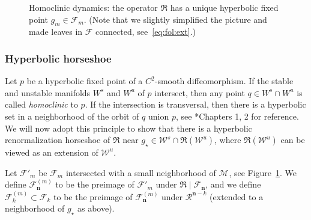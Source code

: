 \documentclass{amsart}
\newcommand{\1}{{\mathbb 1 }}
\newcommand\MM{\mathscr{M}}
\newcommand\RRR{{\mathfrak R}}
\newcommand\RR{\mathcal{R}}
\newcommand{\bbn}{{\mathbf n}}
\newcommand{\str}{{\star}}
\newcommand\WW{\mathcal{W}}
\newcommand\cp{{}}%
\newcommand{\bFol}{{\boldsymbol{ \mathcal F}}}
\theoremstyle{remark}
\numberwithin{equation}{section}
\theoremstyle{definition}
\theoremstyle{nonumberbreak}
\begin{document}
\begin{figure}[tp!]
\caption{Homoclinic dynamics: the operator $\RRR$ has a unique hyperbolic fixed point $g_m\in \bFol_m$. (Note that we slightly simplified the picture and made leaves in $\bFol$ connected, see~\eqref{eq:fol:ext}.)}
\label{fig:HomDyn}
\end{figure}


\subsubsection{Hyperbolic horseshoe} 
Let $p$ be a hyperbolic fixed point of a $C^2$-smooth diffeomorphism. If the stable and unstable manifolds $W^s$ and $W^u$ of $p$ intersect, then any point $q\in W^s\cap W^u $ is called \emph{homoclinic} to $p$. If the intersection is transversal, then there is a hyperbolic set in a neighborhood of the orbit of $q$ union $p$, see \cite{PT}*{Chapters 1, 2} for reference. We will now adopt this principle to show that there is a hyperbolic renormalization horseshoe of $\RRR$ near $g_\str\in \WW^s\cap \RRR (\WW^u)$, where  $\RRR (\WW^u)$ can be viewed as an extension of $\WW^u$.
  
 Let $\bFol'_m$ be $\bFol_m$ intersected with a small neighborhood of $\MM_\cp$, see Figure~\ref{fig:HomDyn}.  We define $\bFol^{(m)}_\bbn$ to be the preimage of $\bFol'_m$ under $\RRR\mid \bFol_\bbn$, and we define  $\bFol^{(m)}_k\subset \bFol_k$ to be the preimage of $\bFol^{(m)}_\bbn$ under $\RR^{\bbn-k}$ (extended to a neighborhood of $g_\str$ as above).
\end{document}

